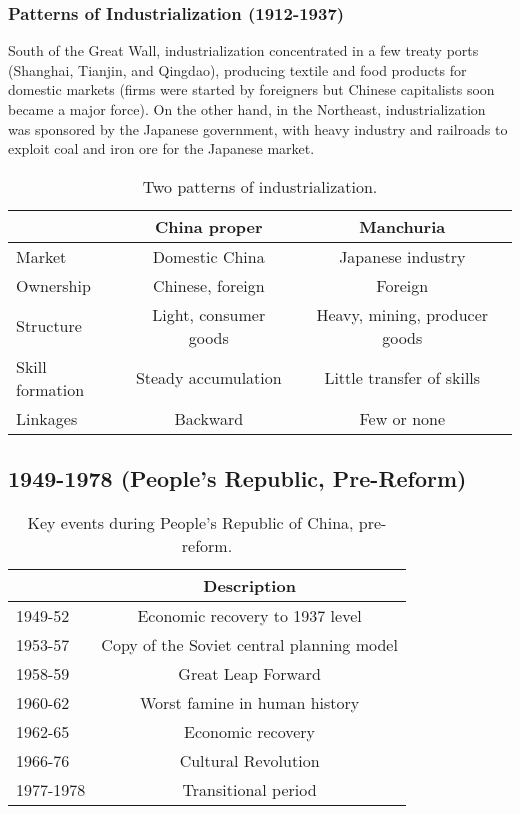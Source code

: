 \documentclass[11pt]{article}
\theoremstyle{definition}
\theoremstyle{remark}
\begin{document}
\subsubsection{Patterns of Industrialization (1912-1937)}
South of the Great Wall, industrialization concentrated in a few treaty ports (Shanghai, Tianjin, and Qingdao), producing textile and food products for domestic markets (firms were started by foreigners but Chinese capitalists soon became a major force). On the other hand, in the Northeast, industrialization was sponsored by the Japanese government, with heavy industry and railroads to exploit coal and iron ore for the Japanese market.
\begin{table}[ht]
\centering
\caption{Two patterns of industrialization.}
\begin{tabular}[t]{lcc}
\toprule
&China proper&Manchuria\\
\midrule
Market&Domestic China&Japanese industry\\
Ownership&Chinese, foreign&Foreign\\
Structure&Light, consumer goods&Heavy, mining, producer goods\\
Skill formation&Steady accumulation&Little transfer of skills\\
Linkages&Backward&Few or none\\
\bottomrule
\end{tabular}
\end{table}%

\subsection{1949-1978 (People's Republic, Pre-Reform)}
\begin{table}[ht]
\centering
\caption{Key events during People's Republic of China, pre-reform.}
\begin{tabular}[t]{lc}
\toprule
&Description\\
\midrule
1949-52&Economic recovery to 1937 level\\
1953-57&Copy of the Soviet central planning model\\
1958-59&Great Leap Forward\\
1960-62&Worst famine in human history\\
1962-65&Economic recovery\\
1966-76&Cultural Revolution\\
1977-1978&Transitional period\\
\bottomrule
\end{tabular}
\end{table}
\end{document}
